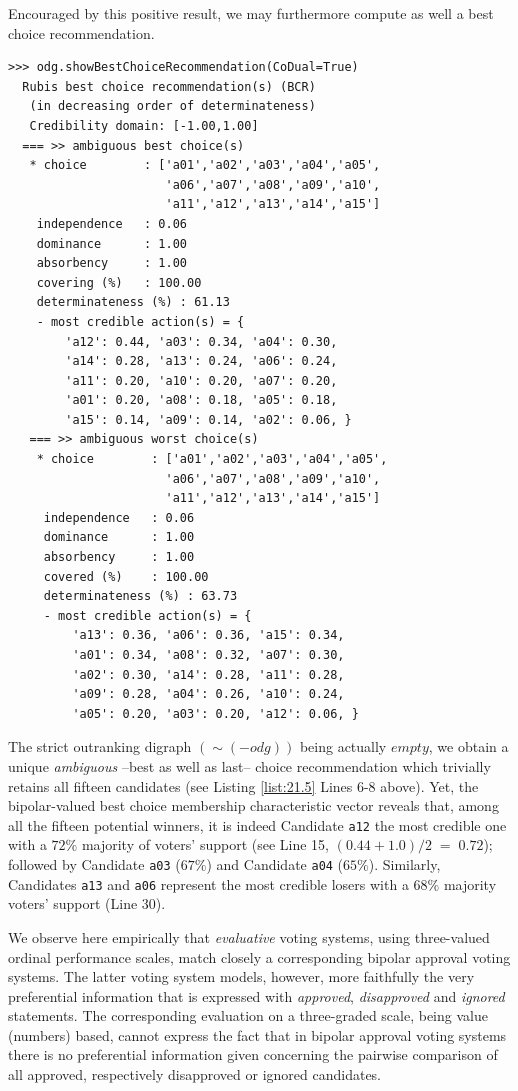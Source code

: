 Encouraged by this positive result, we may furthermore compute as well a best choice recommendation.
\begin{lstlisting}[caption={Computing a best social choice recommendation},label=list:21.5]
>>> odg.showBestChoiceRecommendation(CoDual=True)
  Rubis best choice recommendation(s) (BCR)
   (in decreasing order of determinateness)   
   Credibility domain: [-1.00,1.00]
  === >> ambiguous best choice(s) 
   * choice        : ['a01','a02','a03','a04','a05',
                      'a06','a07','a08','a09','a10',
                      'a11','a12','a13','a14','a15']
    independence   : 0.06
    dominance      : 1.00
    absorbency     : 1.00
    covering (%)   : 100.00
    determinateness (%) : 61.13
    - most credible action(s) = {
        'a12': 0.44, 'a03': 0.34, 'a04': 0.30,
        'a14': 0.28, 'a13': 0.24, 'a06': 0.24,
        'a11': 0.20, 'a10': 0.20, 'a07': 0.20,
        'a01': 0.20, 'a08': 0.18, 'a05': 0.18,
        'a15': 0.14, 'a09': 0.14, 'a02': 0.06, }
   === >> ambiguous worst choice(s)
    * choice        : ['a01','a02','a03','a04','a05',
                      'a06','a07','a08','a09','a10',
                      'a11','a12','a13','a14','a15']
     independence   : 0.06
     dominance      : 1.00
     absorbency     : 1.00
     covered (%)    : 100.00
     determinateness (%) : 63.73
     - most credible action(s) = {
         'a13': 0.36, 'a06': 0.36, 'a15': 0.34,
         'a01': 0.34, 'a08': 0.32, 'a07': 0.30,
         'a02': 0.30, 'a14': 0.28, 'a11': 0.28,
         'a09': 0.28, 'a04': 0.26, 'a10': 0.24,
         'a05': 0.20, 'a03': 0.20, 'a12': 0.06, }
\end{lstlisting}
The strict outranking digraph $(\sim (-odg))$ being actually $empty$, we obtain a unique \emph{ambiguous} --best as well as last-- choice recommendation which trivially retains all fifteen candidates (see Listing \ref{list:21.5} Lines 6-8 above). Yet, the bipolar-valued best choice membership characteristic vector reveals that, among all the fifteen potential winners, it is indeed Candidate \texttt{a12} the most credible one with a $72\%$ majority of voters' support (see Line 15, $(0.44 + 1.0)/2\;=\; 0.72$); followed by Candidate \texttt{a03} ($67\%$) and Candidate \texttt{a04} ($65\%$). Similarly, Candidates \texttt{a13} and \texttt{a06} represent the most credible losers with a $68\%$ majority voters' support (Line 30).

We observe here empirically that \emph{evaluative} voting systems, using three-valued ordinal performance scales, match closely a corresponding bipolar approval voting systems. The latter voting system models, however, more faithfully the very preferential information that is expressed with \emph{approved}, \emph{disapproved} and \emph{ignored} statements. The corresponding evaluation on a three-graded scale, being value (numbers) based, cannot express the fact that in bipolar approval voting systems there is no preferential information given concerning the pairwise comparison of all approved, respectively disapproved or ignored candidates.

